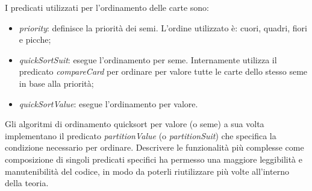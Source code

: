I predicati utilizzati per l’ordinamento delle carte sono:
\begin{itemize}
    \item \textit{priority}: definisce la priorità dei semi.
    L’ordine utilizzato è: cuori, quadri, fiori e picche;
    \item \textit{quickSortSuit}: esegue l’ordinamento per seme.
    Internamente utilizza il predicato \textit{compareCard} per ordinare per valore tutte le carte dello stesso seme in base alla priorità;
    \item \textit{quickSortValue}: esegue l’ordinamento per valore.
\end{itemize}
Gli algoritmi di ordinamento quicksort per valore (o seme) a sua volta implementano il predicato \textit{partitionValue} (o \textit{partitionSuit}) che specifica la condizione necessario per ordinare.
\newline \newline
Descrivere le funzionalità più complesse come composizione di singoli predicati specifici ha permesso una maggiore leggibilità e manutenibilità del codice, in modo da poterli riutilizzare più volte all’interno della teoria.

